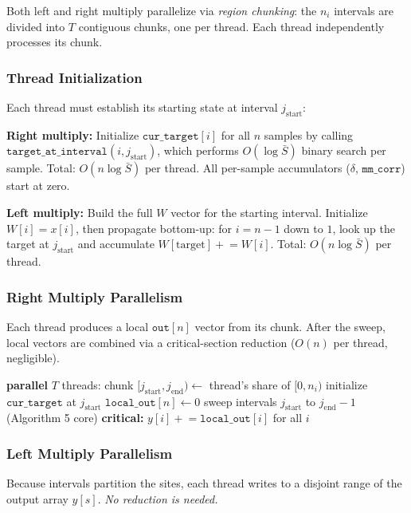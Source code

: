 \documentclass[11pt]{article}
\begin{document}
Both left and right multiply parallelize via \emph{region chunking}: the
$n_i$ intervals are divided into $T$ contiguous chunks, one per thread.
Each thread independently processes its chunk.

\subsubsection{Thread Initialization}

Each thread must establish its starting state at interval $j_\text{start}$:

\textbf{Right multiply:} Initialize $\texttt{cur\_target}[i]$ for all $n$
samples by calling $\texttt{target\_at\_interval}(i, j_\text{start})$,
which performs $O(\log \bar{S})$ binary search per sample.  Total: $O(n
\log \bar{S})$ per thread.  All per-sample accumulators ($\delta$,
$\texttt{mm\_corr}$) start at zero.

\textbf{Left multiply:} Build the full $W$ vector for the starting
interval.  Initialize $W[i] = x[i]$, then propagate bottom-up: for $i =
n{-}1$ down to $1$, look up the target at $j_\text{start}$ and accumulate
$W[\text{target}] \mathrel{+}= W[i]$.  Total: $O(n \log \bar{S})$ per
thread.

\subsubsection{Right Multiply Parallelism}

Each thread produces a local $\texttt{out}[n]$ vector from its chunk.
After the sweep, local vectors are combined via a critical-section
reduction ($O(n)$ per thread, negligible).

\begin{algorithmic}[1]
\State \textbf{parallel} $T$ threads:
\State \quad chunk $[j_\text{start}, j_\text{end}) \gets$ thread's share of $[0, n_i)$
\State \quad initialize $\texttt{cur\_target}$ at $j_\text{start}$
\State \quad $\texttt{local\_out}[n] \gets 0$
\State \quad sweep intervals $j_\text{start}$ to $j_\text{end} - 1$ (Algorithm 5 core)
\State \quad \textbf{critical:} $y[i] \mathrel{+}= \texttt{local\_out}[i]$ for all $i$
\end{algorithmic}

\subsubsection{Left Multiply Parallelism}

Because intervals partition the sites, each thread writes to a disjoint
range of the output array $y[s]$.  \emph{No reduction is needed.}
\end{document}
